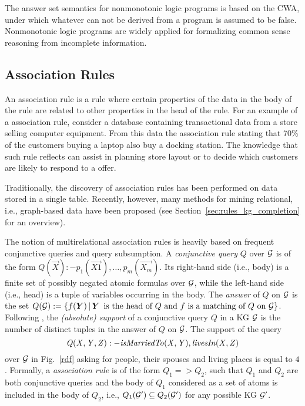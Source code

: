 The answer set semantics for nonmonotonic logic programs is based on the CWA, under which whatever can not be derived from a program is assumed to be false. Nonmonotonic logic programs are widely applied for formalizing common sense reasoning from incomplete information.
\subsection{Association Rules}
An association rule is a rule where certain properties of the data in the body of
the rule are related to other properties in the head of the rule. For an example of a association rule, consider a
database containing transactional data from a store selling computer equipment.
From this data the association rule stating that 70\% of the customers
buying a laptop also buy a docking station. The knowledge that such rule reflects 
can assist in planning store layout or to decide which customers are likely to respond to a
offer.

Traditionally, the discovery of association rules  has been performed on data stored in a single table.
Recently, however, many methods for mining relational, i.e., graph-based data have been
proposed (see Section~\ref{sec:rules_kg_completion} for an overview). 

The notion of multirelational association rules is heavily based on frequent conjunctive queries and query subsumption. 
A \emph{conjunctive query} $Q$ over $\mathcal{G}$ is of the form $Q(\vec{X}):-p_1(\vec{X1}),\dotsc,p_m(\vec{X_m})$. Its  right-hand side (i.e., body) is a finite set of possibly negated atomic formulas over $\mathcal{G}$, while the left-hand side (i.e., head) is a tuple of variables occurring in the body. The \emph{answer} of $Q$ on $\mathcal{G}$ is the set $Q(\cG):=\{f(\vec{Y})\,|\,\vec{Y}\,\text{  is the head of } Q \text{ and } f \text{ is a matching of }\\ Q \text{ on } \cG\}$.
Following \cite{DBLP:conf/ilp/DehaspeR97}, the \emph{(absolute) support} of a conjunctive query $Q$ in a KG $\mathcal{G}$ is the number of distinct tuples in the answer of $Q$ on $\mathcal{G}$. The support of the query
\begin{equation}\mathit{Q(X,Y,Z):-isMarriedTo(X,Y),\, }\mathit{livesIn(X,Z)}
\end{equation}
over $\mathcal{G}$ in Fig.~\ref{rdf} asking for people, their spouses and living places is equal to $4$. 
Formally, a \emph{association rule} is of the form $Q_1 => Q_2$, such that $Q_1$ and $Q_2$ are both conjunctive queries and the body of $Q_1$ considered as a set of atoms is included in the body of $Q_2$,  i.e., $Q_1(\mathcal{G}')\subseteq Q_2(\mathcal{G}')$ for any possible KG $\mathcal{G}'$. 

